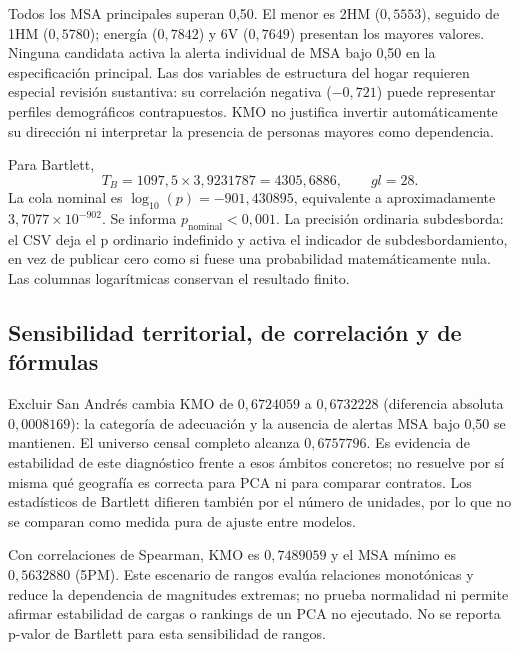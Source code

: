 

Todos los MSA principales superan 0,50. El menor es 2HM ($0,5553$), seguido de 1HM ($0,5780$); energía ($0,7842$) y 6V ($0,7649$) presentan los mayores valores. Ninguna candidata activa la alerta individual de MSA bajo 0,50 en la especificación principal. Las dos variables de estructura del hogar requieren especial revisión sustantiva: su correlación negativa ($-0,721$) puede representar perfiles demográficos contrapuestos. KMO no justifica invertir automáticamente su dirección ni interpretar la presencia de personas mayores como dependencia.

Para Bartlett,
\[
T_B=1097{,}5\times3,9231787=4305{,}6886,\qquad gl=28.
\]
La cola nominal es $\log_{10}(p)=-901,430895$, equivalente a aproximadamente $3,7077\times10^{-902}$. Se informa $p_{\mathrm{nominal}}<0,001$. La precisión ordinaria subdesborda: el CSV deja el p ordinario indefinido y activa el indicador de subdesbordamiento, en vez de publicar cero como si fuese una probabilidad matemáticamente nula. Las columnas logarítmicas conservan el resultado finito.

\subsection{Sensibilidad territorial, de correlación y de fórmulas}



Excluir San Andrés cambia KMO de $0,6724059$ a $0,6732228$ (diferencia absoluta $0,0008169$): la categoría de adecuación y la ausencia de alertas MSA bajo 0,50 se mantienen. El universo censal completo alcanza $0,6757796$. Es evidencia de estabilidad de este diagnóstico frente a esos ámbitos concretos; no resuelve por sí misma qué geografía es correcta para PCA ni para comparar contratos. Los estadísticos de Bartlett difieren también por el número de unidades, por lo que no se comparan como medida pura de ajuste entre modelos.

Con correlaciones de Spearman, KMO es $0,7489059$ y el MSA mínimo es $0,5632880$ (5PM). Este escenario de rangos evalúa relaciones monotónicas y reduce la dependencia de magnitudes extremas; no prueba normalidad ni permite afirmar estabilidad de cargas o rankings de un PCA no ejecutado. No se reporta p-valor de Bartlett para esta sensibilidad de rangos.



